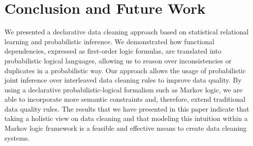 
\section{Conclusion and Future Work}
\label{sec:conclusion}
We presented a declarative data cleaning approach based on statistical relational learning and probabilistic inference. We demonstrated how functional dependencies, expressed as first-order logic formulas, are translated into probabilistic logical languages, allowing us to reason over inconsistencies or duplicates in a probabilistic way. Our approach allows the usage of probabilistic joint inference over interleaved data cleaning rules to improve data quality. By using a declarative probabilistic-logical formalism such as Markov logic, we are able to incorporate more semantic constraints and, therefore, extend traditional data quality rules. The results that we have presented in this paper indicate that taking a holistic view on data cleaning and that modeling this intuition within a Markov logic framework is a feasible and effective means to create data cleaning systems. 
